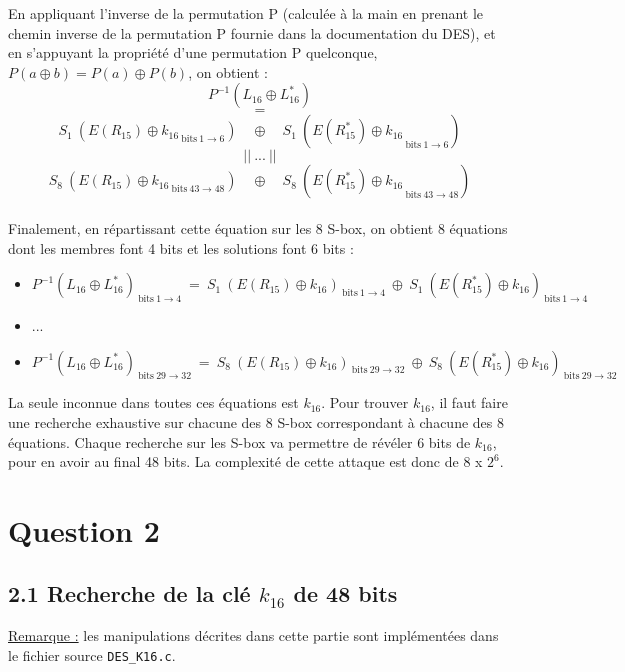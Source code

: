 		\noindent En appliquant l'inverse de la permutation P (calculée à la main en prenant le chemin inverse de la permutation P fournie dans la documentation du DES), et en s'appuyant la propriété d'une permutation P quelconque, $P(a \oplus b) = P(a) \oplus P(b)$, on obtient :
		\[P^{-1}(L_{16} \oplus L_{16}^{*})\]
		\[=\] 
		\[ S_{1}\ ({E(R_{15}) \oplus k_{16}}_{\ \textrm{bits}\ 1 \to 6})\quad \oplus \quad S_{1}\ ({E(R_{15}^{*}) \oplus k_{16}}_{\ \textrm{bits}\ 1 \to 6}) \]
		\[||\ ...\ ||\]
		\[ S_{8}\ ({E(R_{15}) \oplus k_{16}}_{\ \textrm{bits}\ 43 \to 48})\quad \oplus \quad S_{8}\ ({E(R_{15}^{*}) \oplus k_{16}}_{\ \textrm{bits}\ 43 \to 48}) \]
		\\
		\noindent Finalement, en répartissant cette équation sur les 8 S-box, on obtient 8 équations dont les membres font 4 bits et les solutions font 6 bits :
		\begin{itemize}
			\item $P^{-1}(L_{16} \oplus L_{16}^{*})_{\ \textrm{bits}\ 1 \to 4}\ = \ S_{1}\ (E(R_{15}) \oplus k_{16})_{\ \textrm{bits}\ 1 \to 4}\ \oplus \ S_{1}\ (E(R_{15}^{*}) \oplus k_{16})_{\ \textrm{bits}\ 1 \to 4}$
			\item ...
			\item $P^{-1}(L_{16} \oplus L_{16}^{*})_{\ \textrm{bits}\ 29 \to 32}\ = \ S_{8}\ (E(R_{15}) \oplus k_{16})_{\ \textrm{bits}\ 29 \to 32}\ \oplus \ S_{8}\ (E(R_{15}^{*}) \oplus k_{16})_{\ \textrm{bits}\ 29 \to 32}$
		\end{itemize}
		
		La seule inconnue dans toutes ces équations est $k_{16}$. Pour trouver $k_{16}$, il faut faire une recherche exhaustive sur chacune des 8 S-box correspondant à chacune des 8 équations. Chaque recherche sur les S-box va permettre de révéler 6 bits de $k_{16}$, pour en avoir au final 48 bits. La complexité de cette attaque est donc de $8$ x $2^{6}$.
		
	\section*{Question 2}
		\subsection*{2.1 Recherche de la clé $k_{16}$ de 48 bits}
		\noindent \underline{Remarque :} les manipulations décrites dans cette partie sont implémentées dans le fichier source \lstinline!DES_K16.c!.
		


